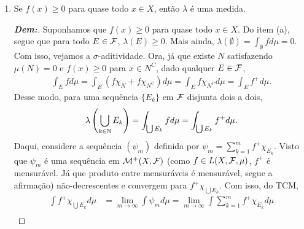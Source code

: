 {\begin{enumerate}[label=\alph*)]
\begin{proof}[\textbf{Dem:}]
      $(\impliedby)$ Suponhamos que $f(x) = 0$ para quase todo $x \in X$. Então, 
      dado $E \in \mcal F$, $(f\chi_E)(x) = 0$ para quase todo $x \in X$. Do exercício
      13, definindo $g(x) = 0$ para todo $x \in X$, segue que $(f\chi_E) = g$ $\mu$-q.t.p., 
      portanto, 
      \begin{align*}
        \lambda(E) = \int_E fd\mu = \int f\chi_E d\mu = \int g d\mu = \int 0 d\mu = 0.
      \end{align*} 
      $(\implies)$ Suponhamos que $\lambda(E) = \int_E f d\mu = \int_E (-f) d\mu = 0$
      para todo $E \in \mcal F$, então, do item (a), temos 
      $f(x) \ge 0$ e $-f(x) \ge 0$ para quase todo $x \in X$. Portanto, $f(x) =0$ 
      para quase todo $x \in X$.
    \end{proof}
  \item Se $f(x) \ge 0$ para quase todo $x \in X$, então $\lambda$ é uma medida.
    \begin{proof}[\textbf{Dem:}]
      Suponhamos que $f(x) \ge 0$ para quase todo $x \in X$. Do item (a), segue 
      que para todo $E \in \mcal F$, $\lambda(E) \ge 0$. Mais ainda, 
      $\lambda(\emptyset) = \int_\emptyset f d\mu = 0$. Com isso, vejamos a 
      $\sigma$-aditividade. Ora, já que existe $N$ satisfazendo $\mu(N) = 0$
      e $f(x)\ge 0$ para $x \in N^C$, dado qualquer $E \in \mcal F$,
      \begin{align*}
        \int_E f d\mu = \int_E (f\chi_N + f\chi_{N^C}) d\mu = \int_E f\chi_{N^C} d\mu =
        \int_E f^+ d\mu.
      \end{align*}
      Desse modo,
      para uma sequência $\{E_k\}$ em $\mathcal F$ 
      disjunta dois a dois,
      \begin{align*}
        \lambda\left(\bigcup_{k \in \mathbb N} E_k\right) = \int_{\bigcup E_k} f d\mu = 
        \int_{\bigcup E_k} f^+ d\mu.
      \end{align*}
      Daqui, considere a sequência $(\psi_m)$
      definida por $\psi_m = \sum_{k=1}^m f^+\chi_{E_k}$. Visto que $\psi_m$ é uma  
      sequência em $\mathcal M^+(X, \mathcal F)$ (como $f \in L(X,\mathcal F, \mu)$, 
      $f^+$ é mensurável. Já que produto entre mensuráveis 
      é mensurável, segue a afirmação)
      não-decrescentes
      e convergem para $f^+ \chi_{\bigcup E_k}$. 
      Com isso, do TCM,
      \begin{align*}
        \int f^+ \chi_{\bigcup E_k} d\mu &= \lim_{m \rightarrow \infty} \int \psi_m d\mu
        = \lim_{m \rightarrow \infty} \int \sum_{k =1 }^m f^+ \chi_{E_k} d\mu \\

\end{align*}
\end{proof}
\end{enumerate}}
